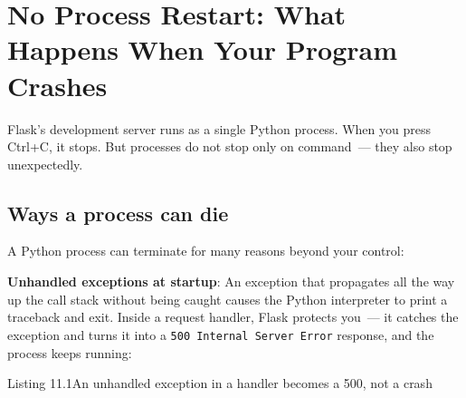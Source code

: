 \setcounter{section}{0}
\section{No Process Restart: What Happens When Your Program Crashes}\label{11-reliability-security-gaps:111-no-process-restart-what-happens-when-your-program-crashes}

Flask's development server runs as a single Python process. When you press Ctrl+C, it stops. But processes do not stop only on command~--- they also stop unexpectedly.

\subsection*{Ways a process can die}\label{11-reliability-security-gaps:ways-a-process-can-die}

A Python process can terminate for many reasons beyond your control:

\textbf{Unhandled exceptions at startup}: An exception that propagates all the way up the call stack without being caught causes the Python interpreter to print a traceback and exit. Inside a request handler, Flask protects you~--- it catches the exception and turns it into a \texttt{500\ Internal\ Server\ Error} response, and the process keeps running:

\begin{codeboxcap}[short]{\textcolor{accent}{Listing 11.1}\enspace An unhandled exception in a handler becomes a 500, not a crash}

\begin{Shaded}
\begin{Highlighting}[]
\NormalTok{(}\NormalTok{)}
\OperatorTok{=}
\OperatorTok{=}
    \NormalTok{: row[}\NormalTok{]\})  }
\end{Highlighting}
\end{Shaded}

\end{codeboxcap}

